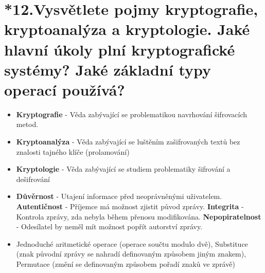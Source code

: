 \section{*12.Vysvětlete pojmy kryptografie, kryptoanalýza a kryptologie. Jaké hlavní úkoly plní kryptografické systémy? Jaké základní typy operací používá?}
\begin{itemize}
    \item \textbf{Kryptografie} - Věda zabývající se problematikou navrhování šifrovacích metod.
    \item \textbf{Kryptoanalýza} - Věda zabývající se luštěním zašifrovaných textů bez znalosti tajného klíče (prolamování)
    \item \textbf{Kryptologie} - Věda zabývající se studiem problematiky šifrování a dešifrování
    \item \textbf{Důvěrnost} - Utajení informace před neoprávněnými uživatelem. \textbf{Autentičnost} - Příjemce má možnost zjistit původ zprávy. \textbf{Integrita} - Kontrola zprávy, zda nebyla během přenosu modifikována. \textbf{Nepopiratelnost} - Odesílatel by neměl mít možnost popřít autorství zprávy.
    \item Jednoduché aritmetické operace (operace součtu modulo dvě), Substituce (znak původní zprávy se nahradí definovaným způsobem jiným znakem), Permutace (změní se definovaným způsobem pořadí znaků ve zprávě)
\end{itemize}

